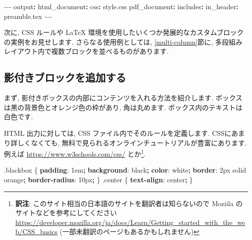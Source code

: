 \documentclass[
  11pt,
  lualatex,
  ja=standard]{bxjsreport}
\newenvironment{Shaded}{\begin{snugshade}}{\end{snugshade}}
\newcommand{\AttributeTok}[1]{\textcolor[rgb]{0.77,0.63,0.00}{#1}}
\newcommand{\ConstantTok}[1]{\textcolor[rgb]{0.00,0.00,0.00}{#1}}
\newcommand{\DataTypeTok}[1]{\textcolor[rgb]{0.13,0.29,0.53}{#1}}
\newcommand{\DecValTok}[1]{\textcolor[rgb]{0.00,0.00,0.81}{#1}}
\newcommand{\FunctionTok}[1]{\textcolor[rgb]{0.00,0.00,0.00}{#1}}
\newcommand{\KeywordTok}[1]{\textcolor[rgb]{0.13,0.29,0.53}{\textbf{#1}}}
\newcommand{\NormalTok}[1]{#1}
\newcommand{\OperatorTok}[1]{\textcolor[rgb]{0.81,0.36,0.00}{\textbf{#1}}}
\newcommand{\PreprocessorTok}[1]{\textcolor[rgb]{0.56,0.35,0.01}{\textit{#1}}}
\begin{document}
\begin{Shaded}
\begin{Highlighting}[]
\PreprocessorTok{{-}{-}{-}}
\FunctionTok{output}\KeywordTok{:}
\AttributeTok{  }\FunctionTok{html\_document}\KeywordTok{:}
\AttributeTok{    }\FunctionTok{css}\KeywordTok{:}\AttributeTok{ style.css}
\AttributeTok{  }\FunctionTok{pdf\_document}\KeywordTok{:}
\AttributeTok{    }\FunctionTok{includes}\KeywordTok{:}
\AttributeTok{      }\FunctionTok{in\_header}\KeywordTok{:}\AttributeTok{ preamble.tex}
\PreprocessorTok{{-}{-}{-}}
\end{Highlighting}
\end{Shaded}

次に, CSS ルールや LaTeX 環境を使用したいくつか発展的なカスタムブロックの実例をお見せします. さらなる使用例としては, \ref{multi-column}節に, 多段組みレイアウト内で複数ブロックを並べるものがあります.

\hypertarget{block-shaded}{%
\subsection{影付きブロックを追加する}\label{block-shaded}}

まず, 影付きボックスの内部にコンテンツを入れる方法を紹介します. ボックスは黒の背景色とオレンジ色の枠があり, 角は丸めます. ボックス内のテキストは白色です.

HTML 出力に対しては, CSS ファイル内でそのルールを定義します. CSSにあまり詳しくなくても, 無料で見られるオンラインチュートリアルが豊富にあります. 例えば \url{https://www.w3schools.com/css/} とか\footnote{\textbf{訳注}: このサイト相当の日本語のサイトを翻訳者は知らないので Moziila のサイトなどを参考にしてください \url{https://developer.mozilla.org/ja/docs/Learn/Getting_started_with_the_web/CSS_basics} (一部未翻訳のページもあるかもしれません)}.

\begin{Shaded}
\begin{Highlighting}[numbers=left,,]
\FunctionTok{.blackbox}\NormalTok{ \{}
  \KeywordTok{padding}\NormalTok{: }\DecValTok{1}\DataTypeTok{em}\OperatorTok{;}
  \KeywordTok{background}\NormalTok{: }\ConstantTok{black}\OperatorTok{;}
  \KeywordTok{color}\NormalTok{: }\ConstantTok{white}\OperatorTok{;}
  \KeywordTok{border}\NormalTok{: }\DecValTok{2}\DataTypeTok{px} \DecValTok{solid} \ConstantTok{orange}\OperatorTok{;}
  \KeywordTok{border{-}radius}\NormalTok{: }\DecValTok{10}\DataTypeTok{px}\OperatorTok{;}
\NormalTok{\}}
\FunctionTok{.center}\NormalTok{ \{}
  \KeywordTok{text{-}align}\NormalTok{: }\DecValTok{center}\OperatorTok{;}
\NormalTok{\}}
\end{Highlighting}
\end{Shaded}
\end{document}
